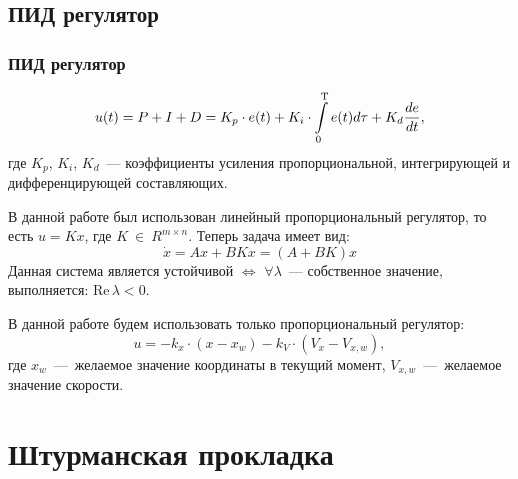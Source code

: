 \documentclass[10pt,t]{beamer}
\begin{document}
\subsection[ПИД регулятор]{ПИД регулятор}
\begin{frame}
\frametitle{ПИД регулятор}
\small

\begin{equation*}
    u(t) = P + I + D = K_p\cdot e(t) + K_i \cdot \int\limits_0^\text{\textup{T}} e(t) d\tau + K_d \frac{de}{dt},
\end{equation*} 
где $K_p$, $K_i$, $K_d$~--- коэффициенты усиления пропорциональной, интегрирующей и дифференцирующей составляющих.

В данной работе был использован линейный пропорциональный регулятор, то есть $u = Kx$, где $K~\in~R^{m\times n}$.
Теперь задача имеет вид:
\begin{equation*}\label{PID_lin}
    \Dot{x} = Ax + BKx = (A+BK)x
\end{equation*}
Данная система является устойчивой $\Longleftrightarrow$ $\forall \lambda$~--- собственное значение, выполняется: $\mathrm{Re}\,\lambda < 0$.

В данной работе будем использовать только пропорциональный регулятор:
$$u = -k_x \cdot (x - x_w) - k_V\cdot (V_x - V_{x,w}),$$
где $x_w$~---~желаемое значение координаты в текущий момент,
$V_{x,w}$~---~желаемое значение скорости.
\end{frame}
\section[Штурм.прокладка]{Штурманская прокладка}
\end{document}

